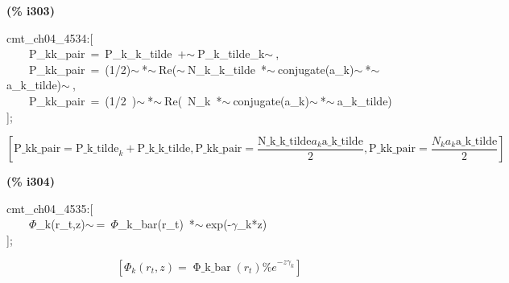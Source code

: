 \documentclass[fleqn]{article}
\begin{document}
\noindent
\begin{minipage}[t]{4.000000em}\color{red}\bfseries
(\% i303)	
\end{minipage}
\begin{minipage}[t]{\textwidth}\color{blue}
cmt\_ch04\_4534:[\\
\ \ \ \ P\_kk\_pair\ =\ P\_k\_k\_tilde\ +\ensuremath{\sim\ }P\_k\_tilde\_k\ensuremath{\sim\ },\ \\
\ \ \ \ P\_kk\_pair\ =\ (1/2)\ensuremath{\sim\ }*\ensuremath{\sim\ }Re(\ensuremath{\sim\ }N\_k\_k\_tilde\ *\ensuremath{\sim\ }conjugate(a\_k)\ensuremath{\sim\ }*\ensuremath{\sim\ }a\_k\_tilde)\ensuremath{\sim\ },\\
\ \ \ \ P\_kk\_pair\ =\ (1/2\ )\ensuremath{\sim\ }*\ensuremath{\sim\ }Re(\ N\_k\ *\ensuremath{\sim\ }conjugate(a\_k)\ensuremath{\sim\ }*\ensuremath{\sim\ }a\_k\_tilde)\\
];
\end{minipage}
\[\displaystyle \tag{\% o303} 
\operatorname{[}\ensuremath{\mathrm{P\_ kk\_ pair}}={{\ensuremath{\mathrm{P\_ k\_ tilde}}}_k}+\ensuremath{\mathrm{P\_ k\_ k\_ tilde}}\operatorname{,}\ensuremath{\mathrm{P\_ kk\_ pair}}=\frac{\ensuremath{\mathrm{N\_ k\_ k\_ tilde}} {a_k} \ensuremath{\mathrm{a\_ k\_ tilde}}}{2}\operatorname{,}\ensuremath{\mathrm{P\_ kk\_ pair}}=\frac{{N_k} {a_k} \ensuremath{\mathrm{a\_ k\_ tilde}}}{2}\operatorname{]}\mbox{}
\]


\noindent
\begin{minipage}[t]{4.000000em}\color{red}\bfseries
(\% i304)	
\end{minipage}
\begin{minipage}[t]{\textwidth}\color{blue}
cmt\_ch04\_4535:[\\
\ \ \ \ \ensuremath{\Phi}\_k(r\_t,z)\ensuremath{\sim\ }=\ \ensuremath{\Phi}\_k\_bar(r\_t)\ *\ensuremath{\sim\ }exp(-\ensuremath{\gamma}\_k*z)\\
];
\end{minipage}
\[\displaystyle \tag{\% o304} 
\left[ {{\Phi }_k}\left( {r_t}\operatorname{,}z\right) =\operatorname{\Phi \_ k\_ bar}\left( {r_t}\right)  {{\% e}^{-z {{\gamma }_k}}}\right] \mbox{}
\]
\end{document}
